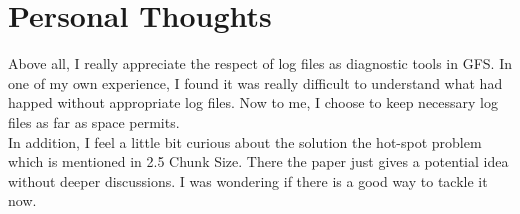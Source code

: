 \documentclass[10pt, letterpaper]{article}
\begin{document}
\section{Personal Thoughts}
\label{sec-thoughts}
Above all, I really appreciate the respect of log files as diagnostic tools in GFS. In one of my own experience, I found it was really difficult to understand what had happed without appropriate log files. Now to me, I choose to keep necessary log files as far as space permits.
\\In addition, I feel a little bit curious about the solution the hot-spot problem which is mentioned in 2.5 Chunk Size. There the paper just gives a potential idea without deeper discussions. I was wondering if there is a good way to tackle it now. 



\end{document}
